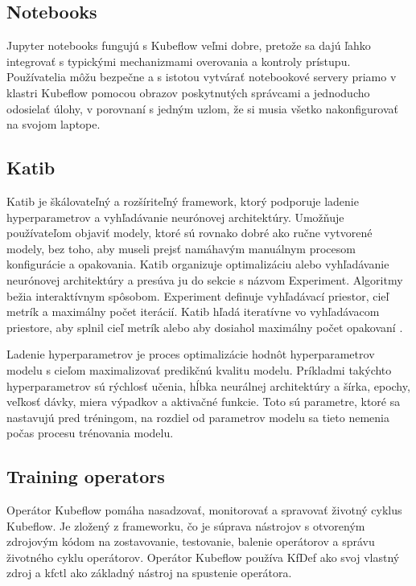 \subsection*{Notebooks}

Jupyter notebooks fungujú s Kubeflow veľmi dobre, pretože sa dajú ľahko integrovať s typickými mechanizmami overovania a kontroly prístupu. Používatelia môžu bezpečne a s istotou vytvárať notebookové servery priamo v klastri Kubeflow pomocou obrazov poskytnutých správcami a jednoducho odosielať úlohy, v porovnaní s jedným uzlom, že si musia všetko nakonfigurovať na svojom laptope.

\subsection*{Katib}

Katib je škálovateľný a rozšíriteľný framework, ktorý podporuje ladenie hyperparametrov a vyhľadávanie neurónovej architektúry. Umožňuje používateľom objaviť modely, ktoré sú rovnako dobré ako ručne vytvorené modely, bez toho, aby museli prejsť namáhavým manuálnym procesom konfigurácie a opakovania. Katib organizuje optimalizáciu alebo vyhľadávanie neurónovej architektúry a presúva ju do sekcie s názvom Experiment. Algoritmy bežia interaktívnym spôsobom. Experiment definuje vyhľadávací priestor, cieľ metrík a maximálny počet iterácií. Katib hľadá iteratívne vo vyhľadávacom priestore, aby splnil cieľ metrík alebo aby dosiahol maximálny počet opakovaní \cite{katib}.

Ladenie hyperparametrov je proces optimalizácie hodnôt hyperparametrov modelu s cieľom maximalizovať predikčnú kvalitu modelu. Príkladmi takýchto hyperparametrov sú rýchlosť učenia, hĺbka neurálnej architektúry a šírka, epochy, veľkosť dávky, miera výpadkov a aktivačné funkcie. Toto sú parametre, ktoré sa nastavujú pred tréningom, na rozdiel od parametrov modelu sa tieto nemenia počas procesu trénovania modelu.

\subsection*{Training operators}

Operátor Kubeflow pomáha nasadzovať, monitorovať a spravovať životný cyklus Kubeflow. Je zložený z frameworku, čo je súprava nástrojov s otvoreným zdrojovým kódom na zostavovanie, testovanie, balenie operátorov a správu životného cyklu operátorov. Operátor Kubeflow používa KfDef ako svoj vlastný zdroj a kfctl ako základný nástroj na spustenie operátora.

